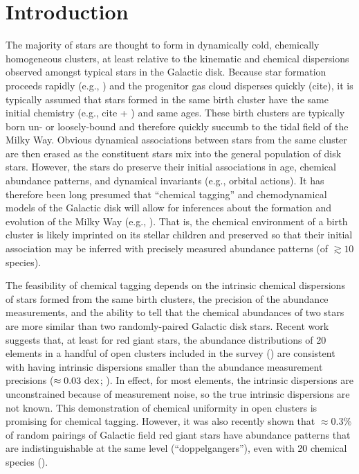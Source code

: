 \documentclass[modern, letterpaper]{aastex61}
\newcommand{\dex}{\ensuremath{{\rm dex}}}
\begin{document}

\section{Introduction}\label{sec:introduction}

The majority of stars are thought to form in dynamically cold, chemically
homogeneous clusters, at least relative to the kinematic and chemical
dispersions observed amongst typical stars in the Galactic disk.
Because star formation proceeds rapidly (e.g., \citealt{Bovy:2016}) and the
progenitor gas cloud disperses quickly (cite), it is typically assumed that
stars formed in the same birth cluster have the same initial chemistry
(e.g., cite + \citealt{Feng:2014}) and same ages.
These birth clusters are typically born un- or loosely-bound and therefore
quickly succumb to the tidal field of the Milky Way.
Obvious dynamical associations between stars from the same cluster are then
erased as the constituent stars mix into the general population of disk stars.
However, the stars do preserve their initial associations in age, chemical
abundance patterns, and dynamical invariants (e.g., orbital actions).
It has therefore been long presumed that ``chemical tagging'' and chemodynamical
models of the Galactic disk will allow for inferences about the formation and
evolution of the Milky Way (e.g., \citealt{todo}).
That is, the chemical environment of a birth cluster is likely imprinted on its
stellar children and preserved so that their initial association may be inferred
with precisely measured abundance patterns (of $\gtrsim 10$ species).

The feasibility of chemical tagging depends on the intrinsic chemical
dispersions of stars formed from the same birth clusters, the precision of the
abundance measurements, and the ability to tell that the chemical abundances of
two stars are more similar than two randomly-paired Galactic disk stars.
Recent work suggests that, at least for red giant stars, the abundance
distributions of 20 elements in a handful of open clusters included in the
 survey (\citealt{Majewski:2016,Nidever:2015}) are consistent
with having intrinsic dispersions smaller than the abundance measurement
precisions ($\approx 0.03~\dex$; \citealt{Bovy:2016,Ness:2017}).
In effect, for most elements, the intrinsic dispersions are unconstrained
because of measurement noise, so the true intrinsic dispersions are not known.
This demonstration of chemical uniformity in open clusters is promising for
chemical tagging.
However, it was also recently shown that $\approx 0.3\%$ of random pairings of
Galactic field red giant stars have abundance patterns that are
indistinguishable at the same level (``doppelgangers''), even with 20 chemical
species (\citealt{Ness:2017}).
\end{document}
